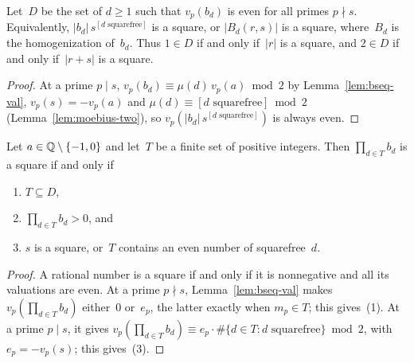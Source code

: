 \begin{definition}
  \label{def:bseq-D}
  \leanok
  Let~$D$ be the set of $d \ge 1$ such that $v_p(b_d)$ is even for all primes $p \nmid s$.
  Equivalently, $|b_d|\, s^{[d \text{ squarefree}]}$ is a square, or $|B_d(r, s)|$ is a square,
  where~$B_d$ is the homogenization of~$b_d$. Thus $1 \in D$ if and only if~$|r|$ is a square,
  and $2 \in D$ if and only if~$|r + s|$ is a square.
\end{definition}
\begin{proof}
  \leanok
  At a prime $p \mid s$, $v_p(b_d) \equiv \mu(d)\, v_p(a) \bmod 2$ by Lemma~\ref{lem:bseq-val},
  $v_p(s) = -v_p(a)$ and $\mu(d) \equiv [d \text{ squarefree}] \bmod 2$
  (Lemma~\ref{lem:moebius-two}), so
  $v_p(|b_d|\, s^{[d \text{ squarefree}]})$ is always even.
\end{proof}

\begin{theorem}
  \label{thm:square-products}
  \leanok
  Let $a \in \mathbb{Q} \setminus \{-1, 0\}$ and let~$T$ be a finite set of positive integers. Then
  $\prod_{d \in T} b_d$ is a square if and only if
  \begin{enumerate}
    \item $T \subseteq D$,
    \item $\prod_{d \in T} b_d > 0$, and
    \item $s$ is a square, or~$T$ contains an even number of squarefree~$d$.
  \end{enumerate}
\end{theorem}
\begin{proof}
  \leanok
  A rational number is a square if and only if it is nonnegative and all its valuations are even.
  At a prime $p \nmid s$, Lemma~\ref{lem:bseq-val} makes $v_p(\prod_{d \in T} b_d)$ either~$0$
  or~$e_p$, the latter exactly when $m_p \in T$; this gives~(1). At a prime $p \mid s$, it
  gives $v_p(\prod_{d \in T} b_d) \equiv e_p \cdot \#\{d \in T : d \text{ squarefree}\}
  \bmod 2$, with $e_p = -v_p(s)$; this gives~(3).
\end{proof}

